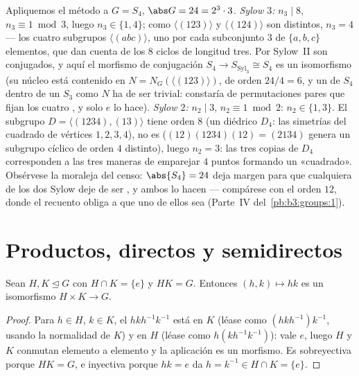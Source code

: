 \begin{example}
\label{ex:b3:groups:s4sylow}
Apliquemos el método a $G = S_4$, $\abs G = 24 = 2^3\cdot3$. \emph{Sylow
$3$:} $n_3 \mid 8$, $n_3 \equiv 1 \bmod 3$, luego $n_3
\in \{1, 4\}$; como $\langle(123)\rangle$ y $\langle(124)\rangle$ son
distintos, $n_3 = 4$ --- los cuatro subgrupos $\langle(abc)\rangle$, uno
por cada subconjunto $3$ de $\{a, b, c\}$ elementos, que dan cuenta de
los $8$ ciclos de longitud tres. Por Sylow~II son conjugados, y aquí el
morfismo de conjugación $S_4 \to
S_{\mathrm{Syl}_3} \cong S_4$ es un isomorfismo (su núcleo está
contenido en $N = N_G(\langle(123)\rangle)$, de orden $24/4 =
6$, y un  de $S_4$ dentro
de un $S_3$ como $N$ ha de ser trivial: constaría de permutaciones pares
que fijan los cuatro , y solo $e$ lo hace).
\emph{Sylow $2$:} $n_2 \mid 3$, $n_2
\equiv 1 \bmod 2$: $n_2 \in \{1, 3\}$. El subgrupo $D =
\langle(1234), (13)\rangle$ tiene orden $8$ (un diédrico $D_4$: las
simetrías del cuadrado de vértices $1, 2, 3, 4$), no es
 ($(12)(1234)(12) = (2134)$ genera
un subgrupo cíclico de orden $4$ distinto), luego $n_2 = 3$: las tres
copias de $D_4$ corresponden a las tres maneras de emparejar $4$ puntos
formando un «cuadrado». Obsérvese la moraleja del censo:
$\abs{S_4} = 24$ deja margen para que cualquiera de los dos Sylow deje
de ser , y ambos lo hacen --- compárese con el orden $12$, donde
el recuento obliga a que uno de ellos sea
 (Parte~IV
del~\cref{pb:b3:groups:1}).
\end{example}

\section{Productos, directos y semidirectos}

\begin{proposition}\label{prop:b3:groups:direct}
Sean $H, K \trianglelefteq G$ con $H \cap K = \{e\}$ y $HK = G$.
Entonces $(h,k) \mapsto hk$ es un isomorfismo $H \times K \to
G$.
\end{proposition}

\begin{proof}
Para $h \in H$, $k \in K$, el 
$hkh^{-1}k^{-1}$ está en $K$ (léase como $(hkh^{-1})k^{-1}$, usando la
normalidad de $K$) y en $H$ (léase como $h(kh^{-1}k^{-1})$): vale $e$,
luego $H$ y $K$ conmutan elemento a elemento y la aplicación es un
morfismo. Es sobreyectiva porque $HK = G$, e inyectiva porque $hk = e$
da $h = k^{-1} \in
H \cap K = \{e\}$.
\end{proof}

